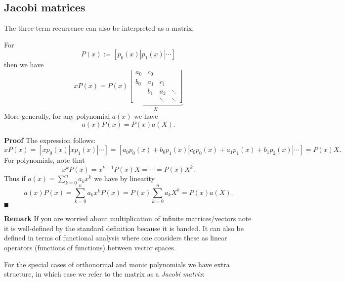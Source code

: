 \subsection{Jacobi matrices}
The three-term recurrence can also be interpreted as a matrix:

\begin{corollary} For
\[
P(x) := [p_0(x) | p_1(x) | \ensuremath{\cdots}]
\]
then we have
\[
x P(x) = P(x) \underbrace{\begin{bmatrix} a_0 & c_0 \\
                                                        b_0 & a_1 & c_1\\
                                                        & b_1 & a_2 & \ensuremath{\ddots} \\
                                                        && \ensuremath{\ddots} & \ensuremath{\ddots}
                                                        \end{bmatrix}}_X
\]
More generally, for any polynomial $a(x)$ we have
\[
a(x) P(x) = P(x) a(X).
\]
\end{corollary}
\textbf{Proof} The expression follows:
\[
x P(x) = [xp_0(x) | xp_1(x) | \ensuremath{\cdots}] =
[a_0p_0(x) + b_0 p_1(x) | c_0 p_0(x) + a_1 p_1(x) + b_1 p_2(x) | \ensuremath{\cdots}] = P(x) X.
\]
For polynomials, note that
\[
x^k P(x) = x^{k-1} P(x) X = \ensuremath{\cdots} = P(x) X^k.
\]
Thus if $a(x) = \ensuremath{\sum}_{k=0}^n a_k x^k$ we have by linearity
\[
a(x) P(x) = \ensuremath{\sum}_{k=0}^n a_k x^k P(x) = P(x) \ensuremath{\sum}_{k=0}^n a_k X^k = P(x) a(X).
\]
\ensuremath{\QED}

\textbf{Remark} If you are worried about multiplication of infinite matrices/vectors note it is well-defined by the standard definition because it is banded. It can also be defined in terms of functional analysis where one considers these as linear operators (functions of functions) between vector spaces.

For the special cases of orthonormal and monic polynomials we have extra structure, in which case we refer to the matrix as a \emph{Jacobi matrix}:


